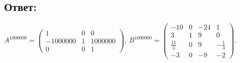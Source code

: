 \documentclass[12pt]{article}
\begin{document}
    \subsection*{Ответ:}
    $
    A^{1000000}
    = \begin{pmatrix}
          1        & 0 & 0       \\
          -1000000 & 1 & 1000000 \\
          0        & 0 & 1
    \end{pmatrix}
    $,
    $
    B^{1000000}
    = \begin{pmatrix}
          -10          & 0 & -24 & 1             \\
          3            & 1 & 9   & 0             \\
          \frac{11}{3} & 0 & 9   & - \frac{1}{3} \\
          -3           & 0 & -9  & -2
    \end{pmatrix}
    $.
\end{document}
